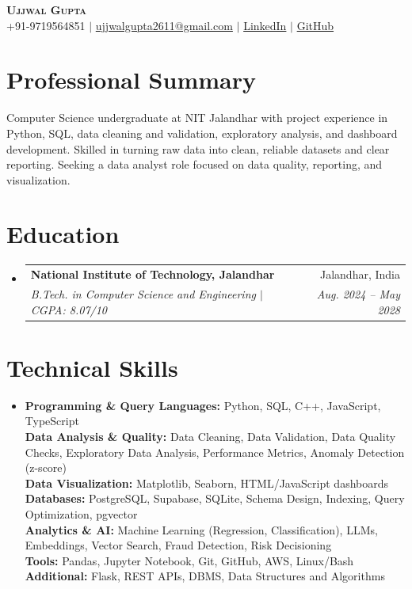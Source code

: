 \documentclass[letterpaper,10pt]{article}
\makeatletter
\newcommand{\resumeSubheading}[4]{\vspace{-2pt}\item
  \begin{tabular*}{0.97\textwidth}[t]{l@{\extracolsep{\fill}}r}
    \textbf{#1} & #2 \\ \textit{\small #3} & \textit{\small #4} \\
  \end{tabular*}\vspace{-7pt}}
\newcommand{\resumeSubHeadingListStart}{\begin{itemize}[leftmargin=0.15in,label={},topsep=2pt,itemsep=1pt]}
\newcommand{\resumeSubHeadingListEnd}{\end{itemize}}
\makeatother
\begin{document}
\begin{center}
  \textbf{\Huge \scshape Ujjwal Gupta}\\ \vspace{2pt}\small
  +91-9719564851 $|$ \href{mailto:ujjwalgupta2611@gmail.com}{ujjwalgupta2611@gmail.com} $|$
  \href{https://www.linkedin.com/in/ujjwal-gupta-5947b5321/}{LinkedIn} $|$
  \href{https://github.com/ujjwalg2611}{GitHub}
\end{center}
\vspace{-10pt}

\section{Professional Summary}
\small{Computer Science undergraduate at NIT Jalandhar with project experience in Python, SQL,
data cleaning and validation, exploratory analysis, and dashboard development. Skilled in turning
raw data into clean, reliable datasets and clear reporting. Seeking a data analyst role focused on
data quality, reporting, and visualization.}

\section{Education}
\resumeSubHeadingListStart
  \resumeSubheading
    {National Institute of Technology, Jalandhar}{Jalandhar, India}
    {B.Tech. in Computer Science and Engineering $|$ CGPA: 8.07/10}{Aug. 2024 -- May 2028}
\resumeSubHeadingListEnd

\section{Technical Skills}
\begin{itemize}[leftmargin=0.15in,label={},topsep=1pt,itemsep=1pt]
\small\item{
  \textbf{Programming \& Query Languages:} Python, SQL, C++, JavaScript, TypeScript \\
  \textbf{Data Analysis \& Quality:} Data Cleaning, Data Validation, Data Quality Checks,
  Exploratory Data Analysis, Performance Metrics, Anomaly Detection (z-score) \\
  \textbf{Data Visualization:} Matplotlib, Seaborn, HTML/JavaScript dashboards
  \\
  \textbf{Databases:} PostgreSQL, Supabase, SQLite, Schema Design, Indexing, Query Optimization, pgvector \\
  \textbf{Analytics \& AI:} Machine Learning (Regression, Classification), LLMs, Embeddings,
  Vector Search, Fraud Detection, Risk Decisioning \\
  \textbf{Tools:} Pandas, Jupyter Notebook, Git, GitHub, AWS, Linux/Bash \\
  \textbf{Additional:} Flask, REST APIs, DBMS, Data Structures and Algorithms
}
\end{itemize}
\vspace{-5pt}
\end{document}
